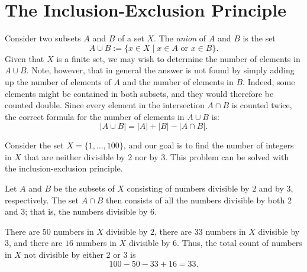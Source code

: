 \section{The Inclusion-Exclusion Principle}

Consider two subsets $A$ and $B$ of a set $X$. The \emph{union} of $A$ and $B$ is the set
\begin{equation*}
  A\cup B :=\{x\in X\mid x\in A\text{ or }x\in B\}.
\end{equation*}
Given that $X$ is a finite set, we may wish to determine the number of elements in $A\cup B$. Note, however, that in general the answer is not found by simply adding up the number of elements of $A$ and the number of elements in $B$. Indeed, some elements might be contained in both subsets, and they would therefore be counted double. Since every element in the intersection $A\cap B$ is counted twice, the correct formula for the number of elements in $A\cup B$ is:
\begin{equation*}
  |A\cup B| = |A| + |B| - |A\cap B|.
\end{equation*}

\begin{example}
  Consider the set $X=\{1,\ldots,100\}$, and our goal is to find the number of integers in $X$ that are neither divisible by $2$ nor by $3$. This problem can be solved with the inclusion-exclusion principle.

  Let $A$ and $B$ be the subsets of $X$ consisting of numbers divisible by $2$ and by $3$, respectively. The set $A\cap B$ then consists of all the numbers divisible by both $2$ and $3$; that is, the numbers divisible by $6$.

  There are $50$ numbers in $X$ divisible by $2$, there are $33$ numbers in $X$ divisible by $3$, and there are $16$ numbers in $X$ divisible by $6$. Thus, the total count of numbers in $X$ not divisible by either $2$ or $3$ is
  \begin{equation*}
    100-50-33+16=33.
  \end{equation*}
\end{example}

